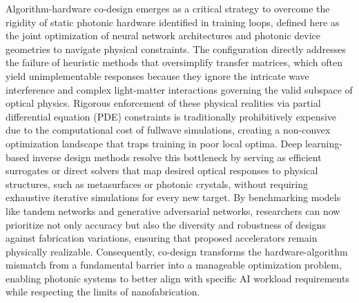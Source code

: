 \documentclass[11pt]{article}
\begin{document}
Algorithm-hardware co-design emerges as a critical strategy to overcome the rigidity of static photonic hardware identified in training loops, defined here as the joint optimization of neural network architectures and photonic device geometries to navigate physical constraints. \citep{doi_10_1109_dac63849_2025_11133307_892a6228} \citep{s2_c41720a8a362c412dc17bab4c3f329f2ac7c9818_1a5c96e4} The configuration directly addresses the failure of heuristic methods that oversimplify transfer matrices, which often yield unimplementable responses because they ignore the intricate wave interference and complex light-matter interactions governing the valid subspace of optical physics. Rigorous enforcement of these physical realities via partial differential equation (PDE) constraints is traditionally prohibitively expensive due to the computational cost of fullwave simulations, creating a non-convex optimization landscape that traps training in poor local optima. Deep learning-based inverse design methods resolve this bottleneck by serving as efficient surrogates or direct solvers that map desired optical responses to physical structures, such as metasurfaces or photonic crystals, without requiring exhaustive iterative simulations for every new target. By benchmarking models like tandem networks and generative adversarial networks, researchers can now prioritize not only accuracy but also the diversity and robustness of designs against fabrication variations, ensuring that proposed accelerators remain physically realizable. Consequently, co-design transforms the hardware-algorithm mismatch from a fundamental barrier into a manageable optimization problem, enabling photonic systems to better align with specific AI workload requirements while respecting the limits of nanofabrication. \citep{doi_10_48550_arxiv_2505_18377_a6fc9ec3} \citep{doi_10_1364_prj_415960_cf59d95b} \citep{doi_10_29026_oes_2022_210012_27973a69}
\end{document}
